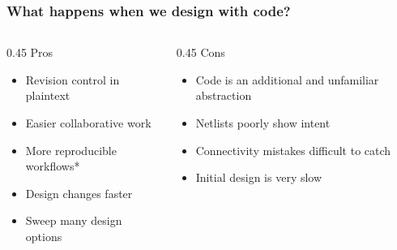 \documentclass[aspectratio=169]{beamer}
\begin{document}
\begin{frame}
  \frametitle{What happens when we design with code?}
  \vfill
  \begin{center}
  \begin{minipage}{0.88\textwidth}
  \begin{columns}[T,totalwidth=\textwidth]
    \begin{column}{0.45\textwidth}
      \textcolor{NordGreen!55!black}{\large Pros}
      \vspace{0.5em}
      \begin{itemize}
        \item[\textcolor{NordGreen!65!black}{\Large $\checkmark$}] Revision control in plaintext
        \item[\textcolor{NordGreen!65!black}{\Large $\checkmark$}] Easier collaborative work
        \item[\textcolor{NordGreen!65!black}{\Large $\checkmark$}] More reproducible workflows*
        \item[\textcolor{NordGreen!65!black}{\Large $\checkmark$}] Design changes faster
        \item[\textcolor{NordGreen!65!black}{\Large $\checkmark$}] Sweep many design options
      \end{itemize}
    \end{column}
    \hfill
    \begin{column}{0.45\textwidth}
      \textcolor{NordRed!85!black}{\large Cons}
      \vspace{0.5em}
      \begin{itemize}
        \item[\textcolor{NordRed!85!black}{\Large $\checkmark$}] Code is an additional and unfamiliar abstraction
        \item[\textcolor{NordRed!85!black}{\Large $\checkmark$}] Netlists poorly show intent
        \item[\textcolor{NordRed!85!black}{\Large $\checkmark$}] Connectivity mistakes difficult to catch
        \item[\textcolor{NordRed!85!black}{\Large $\checkmark$}] Initial design is very slow
      \end{itemize}
    \end{column}
  \end{columns}
  \end{minipage}
  \end{center}
  \vfill
\end{frame}
\end{document}
